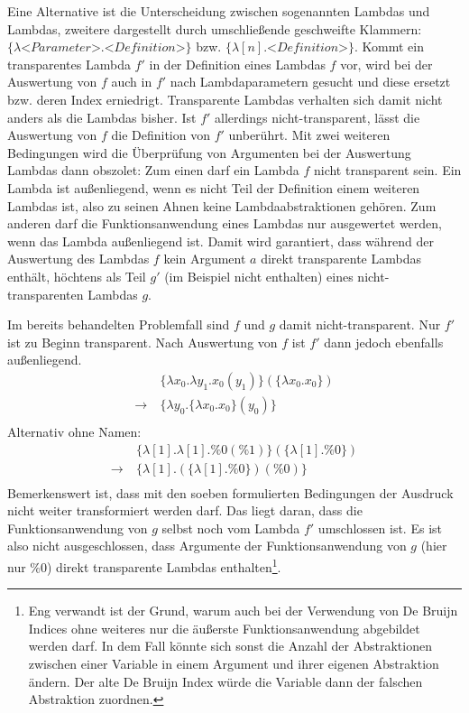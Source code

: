  Eine Alternative ist die Unterscheidung zwischen sogenannten  Lambdas und  Lambdas, zweitere dargestellt durch umschließende geschweifte Klammern: $\{\lambda \textit{<Parameter>}.\textit{<Definition>}\}$ bzw. $\{\lambda [n].\textit{<Definition>}\}$. Kommt ein transparentes Lambda $f'$ in der Definition eines Lambdas $f$ vor, wird bei der Auswertung von $f$ auch in $f'$ nach Lambdaparametern gesucht und diese ersetzt bzw. deren Index erniedrigt. Transparente Lambdas verhalten sich damit nicht anders als die Lambdas bisher. Ist $f'$ allerdings nicht-transparent, lässt die Auswertung von $f$ die Definition von $f'$ unberührt. 
 Mit zwei weiteren Bedingungen wird die Überprüfung von Argumenten bei der Auswertung Lambdas dann obszolet: 
 Zum einen darf ein  Lambda $f$ nicht transparent sein. Ein Lambda ist außenliegend, wenn es nicht Teil der Definition einem weiteren Lambdas ist, also zu seinen Ahnen keine Lambdaabstraktionen gehören. Zum anderen darf die Funktionsanwendung eines Lambdas nur ausgewertet werden, wenn das Lambda außenliegend ist. Damit wird garantiert, dass während der Auswertung des Lambdas $f$ kein Argument $a$ direkt transparente Lambdas enthält, höchtens als Teil $g'$ (im Beispiel nicht enthalten) eines nicht-transparenten Lambdas $g$.

Im bereits behandelten Problemfall sind $f$ und $g$ damit nicht-transparent. Nur $f'$ ist zu Beginn transparent. Nach Auswertung von $f$ ist $f'$ dann jedoch ebenfalls außenliegend.
\begin{align*}
    ~           &~\{\lambda x_0 .\lambda y_1 .x_0(y_1)\}(\{\lambda x_0 .x_0\}) \\
    \rightarrow &~\{\lambda y_0 .\{\lambda x_0 .x_0\}(y_0)\}\\
\end{align*}
Alternativ ohne Namen:
\begin{align*}
    ~           &~\{\lambda [1] .\lambda [1] .\%0(\%1)\}(\{\lambda [1] .\%0\}) \\
    \rightarrow &~\{\lambda [1] .(\{\lambda [1] .\%0\})(\%0)\}\\
\end{align*}
Bemerkenswert ist, dass mit den soeben formulierten Bedingungen der Ausdruck nicht weiter transformiert werden darf. Das liegt daran, dass die Funktionsanwendung von $g$ selbst noch vom Lambda $f'$ umschlossen ist. Es ist also nicht ausgeschlossen, dass Argumente der Funktionsanwendung von $g$ (hier nur $\%0$) direkt transparente Lambdas enthalten\footnote{Eng verwandt ist der Grund, warum auch bei der Verwendung von De Bruijn Indices ohne weiteres nur die äußerste Funktionsanwendung abgebildet werden darf. In dem Fall könnte sich sonst die Anzahl der Abstraktionen zwischen einer Variable in einem Argument und ihrer eigenen Abstraktion ändern. Der alte De Bruijn Index würde die Variable dann der falschen Abstraktion zuordnen.}.





